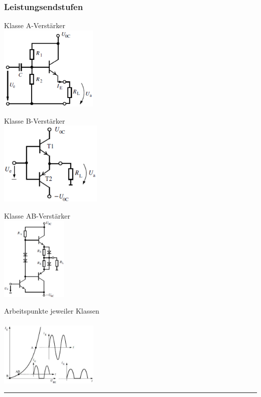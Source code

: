          \subsubsection{Leistungsendstufen}
             \begin{minipage}[T]{4.7cm}
                 Klasse A-Verst\"arker\\
                 \includegraphics[height=4cm]{./bilder/KlassA_Amp.png}
             \end{minipage}
             \begin{minipage}[T]{4.7cm}
                 Klasse B-Verst\"arker\\
                 \includegraphics[height=4cm]{./bilder/KlassB_Amp.png}
             \end{minipage}
             \begin{minipage}[T]{4.7cm}
                 Klasse AB-Verst\"arker\\
                 \includegraphics[height=4cm]{./bilder/KlassAB_Amp.png}
             \end{minipage}
             \begin{minipage}[T]{4.7cm}
                 Arbeitspunkte jeweiler Klassen\\\\
                 \vspace{5mm}
                 \includegraphics[width=4.7cm]{./bilder/EndstufenAP.png}
             \end{minipage}
\vspace{2mm}\hrule

